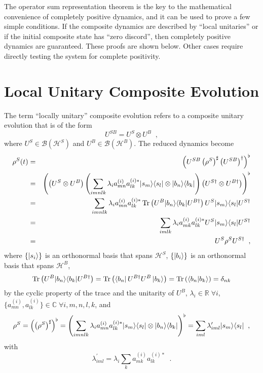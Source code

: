 The operator sum representation theorem is the key to the mathematical convenience of completely positive dynamics, and it can be used to prove a few simple conditions.  If the composite dynamics are described by ``local unitaries'' or if the initial composite state has ``zero discord'', then completely positive dynamics are guaranteed.  These proofs are shown below.  Other cases require directly testing the system for complete positivity.

\section{Local Unitary Composite Evolution}

The term ``locally unitary'' composite evolution refers to a composite unitary evolution that is of the form
\begin{equation*}
U^{SB} = U^S \otimes U^B\;\;,
\end{equation*}
where $U^S\in\mathcal{B}(\mathcal{H}^S)$ and $U^B\in\mathcal{B}(\mathcal{H}^B)$.  The reduced dynamics become
\begin{eqnarray*}
\rho^S(t) &=& \left(U^{SB}\left(\rho^{S}\right)^\sharp\left(U^{SB}\right)^\dagger\right)^\flat\\
&=&\left(\left(U^S\otimes U^B\right)\left(\sum_{imnlk} \lambda_i a_{mn}^{(i)} a_{lk}^{(i)*}|s_m\rangle\langle s_l|\otimes |b_n\rangle\langle b_k|\right)\left(U^{S\dagger}\otimes U^{B\dagger}\right)\right)^\flat\\
&=& \sum_{imnlk} \lambda_i a_{mn}^{(i)} a_{lk}^{(i)*} \operatorname{Tr}\left(U^B|b_n\rangle\langle b_k| U^{B\dagger}\right) U^S|s_m\rangle\langle s_l| U^{S\dagger}\\
&=& \sum_{imlk} \lambda_i a_{mk}^{(i)} a_{lk}^{(i)*} U^S|s_m\rangle\langle s_l| U^{S\dagger}\\
&=& U^S \rho^S U^{S\dagger}\;\;,
\end{eqnarray*}
where $\{\left|s_i\right\rangle\}$ is an orthonormal basis that spans $\mathcal{H}^S$, $\{\left|b_i\right\rangle\}$ is an orthonormal basis that spans $\mathcal{H}^B$, 
$$
\operatorname{Tr}\left(U^B |b_n\rangle\langle b_k| U^{B\dagger}\right) = \operatorname{Tr}\left(\left\langle b_n\right|U^{B\dagger}U^B \left|b_k\right\rangle\right) = \operatorname{Tr}\left(\langle b_n|b_k\rangle\right) = \delta_{nk}
$$
by the cyclic property of the trace and the unitarity of $U^B$, $\lambda_i\in\mathbb{R}\;\forall i$, $\{a_{mn}^{(i)},a_{lk}^{(i)}\}\in\mathbb{C}\;\forall i,m,n,l,k$, and
$$
\rho^S=\left(\left(\rho^{S}\right)^\sharp\right)^\flat=\left(\sum_{imnlk} \lambda_i a_{mn}^{(i)} a_{lk}^{(i)*}|s_m\rangle\langle s_l|\otimes |b_n\rangle\langle b_k|\right)^\flat=\sum_{iml} \lambda_{iml}^\prime |s_m\rangle\langle s_l|\;\;,
$$
with
$$
\lambda_{iml}^\prime = \lambda_i \sum_k  a_{mk}^{(i)} a_{lk}^{(i)*}\;\;.
$$

